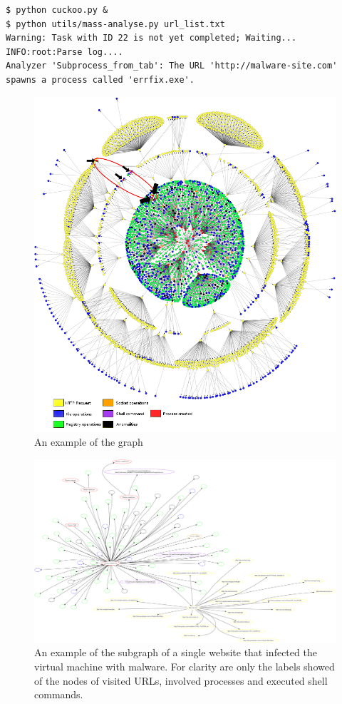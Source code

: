 \begin{lstlisting}
$ python cuckoo.py &
$ python utils/mass-analyse.py url_list.txt
Warning: Task with ID 22 is not yet completed; Waiting...
INFO:root:Parse log....
Analyzer 'Subprocess_from_tab': The URL 'http://malware-site.com' 
spawns a process called 'errfix.exe'.
\end{lstlisting}

\begin{figure}[h]
    \centering
    \centerline{\includegraphics[width=20cm]{Images/graph4.jpg}}
    \caption{An example of the graph}
    \label{fig:graph}
\end{figure}

\begin{figure}[h]
    \centering
    \includegraphics[width=25cm, angle=90]{Images/report_Subprocess_from_tab}
    \caption{An example of the subgraph of a single website that infected the virtual machine with malware. For clarity are only the labels showed of the nodes of visited URLs, involved processes and executed shell commands.}
    \label{fig:subgraph}
\end{figure}

